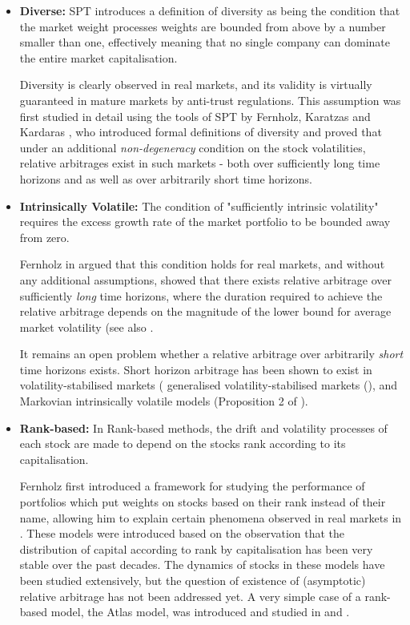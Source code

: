 \documentclass[british]{amsart} \usepackage{lmodern}
\numberwithin{equation}{section} \numberwithin{figure}{section}
\theoremstyle{plain} \newtheorem{thm}{\protect\theoremname}[section]
\theoremstyle{definition} \newtheorem{defn}[thm]{\protect\definitionname}
\theoremstyle{plain} \newtheorem{assumption}[thm]{\protect\assumptionname}
\theoremstyle{plain} \newtheorem{lem}[thm]{\protect\lemmaname}
\theoremstyle{plain} \newtheorem{prop}[thm]{\protect\propositionname}
\theoremstyle{remark} \newtheorem{rem}[thm]{\protect\remarkname}
\theoremstyle{plain} \newtheorem{cor}[thm]{\protect\corollaryname}
\begin{document}
\begin{itemize}

\item \textbf{Diverse:} SPT introduces a definition of diversity as being the
condition that the market weight processes weights are bounded from above by a
number smaller than one, effectively meaning that no single company can dominate
the entire market capitalisation.

Diversity is clearly observed in real markets, and its validity is virtually
guaranteed in mature markets by anti-trust regulations. This assumption was
first studied in detail using the tools of SPT by Fernholz, Karatzas and
Kardaras \cite{fernholz2005}, who introduced formal definitions of diversity and
proved that under an additional \textit{non-degeneracy} condition on the stock
volatilities, relative arbitrages exist in such markets - both over sufficiently
long time horizons and as well as over arbitrarily short time horizons.

\item \textbf{Intrinsically Volatile:} The condition of "sufficiently intrinsic
volatility" requires the excess growth rate of the market portfolio to be
bounded away from zero.

Fernholz in \cite{fernholz2002} argued that this condition holds for real
markets, and without any additional assumptions, showed that there exists
relative arbitrage over sufficiently \textit{long} time horizons, where the
duration required to achieve the relative arbitrage depends on the magnitude of
the lower bound for average market volatility (see also
\cite{fernholz2005relative}.

It remains an open problem whether a relative arbitrage over arbitrarily
\textit{short} time horizons exists. Short horizon arbitrage  has been shown to
exist in volatility-stabilised markets (\cite{banner2008short} generalised
volatility-stabilised markets (\cite{pickova2014generalized}), and Markovian
intrinsically volatile models (Proposition 2 of \cite{fernholz2009}).

\item \textbf{Rank-based:} In Rank-based methods, the drift and volatility
processes of each stock are made to depend on the stocks rank according to its
capitalisation.

Fernholz first introduced a framework for studying the performance of portfolios
which put weights on stocks based on their rank instead of their name, allowing
him to explain certain phenomena observed in real markets in
\cite{fernholz2002}. These models were introduced based on the observation that
the distribution of capital according to rank by capitalisation has been very
stable over the past decades. The dynamics of stocks in these models have been
studied extensively, but the question of existence of (asymptotic) relative
arbitrage has not been addressed yet. A very simple case of a rank-based model,
the Atlas model, was introduced and studied in \cite{banner2005atlas} and
\cite{ichiba2011hybrid}.

\end{itemize}
\end{document}
